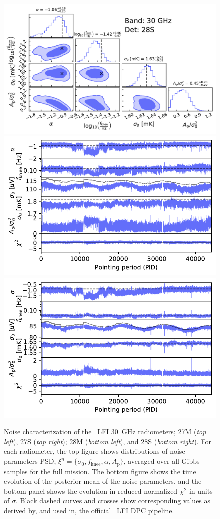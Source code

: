 \documentclass{aa}
\begin{document}
\begin{figure}[p]
\begin{center}
    \includegraphics[width=0.495\linewidth]{figs/corner_band_030_det_4_mean_new.pdf}\\
    \includegraphics[width=0.495\linewidth]{figs/xi_vs_pid_band_030_det_3_mean_new.pdf}
    \includegraphics[width=0.495\linewidth]{figs/xi_vs_pid_band_030_det_4_mean_new.pdf}
     \vspace*{-5.5mm}    
  \end{center}
  
  \caption{Noise characterization of the \Planck\ LFI 30~GHz
    radiometers; 27M (\emph{top left}), 27S (\emph{top right}); 28M
    (\emph{bottom left}), and 28S (\emph{bottom right}). For each
    radiometer, the top figure shows distributions of noise parameters
    PSD, $\xi^n = \{\sigma_0, f_\mathrm{knee}, \alpha, A_\mathrm{p}\}$, averaged
    over all Gibbs samples for the full mission. The bottom figure
    shows the time evolution of the posterior mean of the noise
    parameters, and the bottom panel shows the evolution in reduced
    normalized $\chi^2$ in units of $\sigma$. Black dashed curves and crosses show corresponding values as derived by, and used in, the
    official \Planck\ LFI DPC pipeline.
    \label{fig:xi_prop_30}}
\end{figure}
\end{document}
